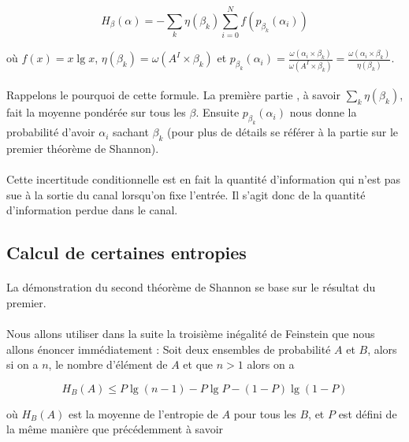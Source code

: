	\[
		H_\beta(\alpha) =
		- \sum_k\eta(\beta_k)\sum_{i=0}^Nf(p_{\beta_k}(\alpha_i))
	\]
	
	où $f(x) = x \lg x$, $\eta(\beta_k) = \omega(A^I \times \beta_k)$
	et 
		$p_{\beta_k}(\alpha_i) = 
		\frac{\omega(\alpha_i \times \beta_k)}{\omega(A^I \times \beta_k)}=
		\frac{\omega(\alpha_i \times \beta_k)}{\eta(\beta_k)}$.
	\paragraph{}
	Rappelons le pourquoi de cette formule. La première partie , à savoir
	$\sum_k\eta(\beta_k)$, fait la moyenne pondérée sur tous les $\beta$.
	Ensuite $p_{\beta_k}(\alpha_i)$ nous donne la probabilité d'avoir 
	$\alpha_i$ sachant $\beta_k$ (pour plus de détails se référer à la partie
	sur le premier théorème de Shannon).
	
	
	
	\paragraph{}
	Cette incertitude conditionnelle est en fait la quantité d'information
	qui n'est pas sue à la sortie du canal lorsqu'on fixe l'entrée. Il 
	s'agit donc de la quantité d'information perdue dans le canal.
	
\subsection*{Calcul de certaines entropies}

	\paragraph{}
	La démonstration du second théorème de Shannon se base sur le 
	résultat du premier. 
	
	\paragraph{}
	Nous allons utiliser dans la suite la troisième inégalité de Feinstein 
	que nous allons énoncer immédiatement :
	Soit deux ensembles de probabilité $A$ et $B$, alors si on a $n$, le 
	nombre d'élément de $A$ et que $n>1$ alors on a 
	
	\[H_B(A)\le P\lg (n-1) - P\lg P - (1-P)\lg(1-P)\]
	
	
	où $H_B(A)$ est la moyenne de l'entropie de $A$ pour tous
	les $B$, et $P$ est défini de la même manière que précédemment à savoir
	
